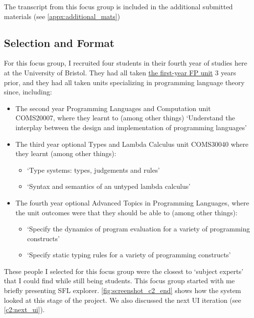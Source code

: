 The transcript from this focus group is included in the additional submitted materials (see \ref{appx:additional_mats})

\subsection{Selection and Format}

For this focus group, I recruited four students in their fourth year of studies here at the University of Bristol. They had all taken \hyperref[COMS10016]{the first-year FP unit} 3 years prior, and they had all taken units specializing in programming language theory since, including:

\begin{itemize}
    \item The second year Programming Languages and Computation unit COMS20007, where they learnt to (among other things) `Understand the interplay between the design and implementation of programming languages' \cite{COMS20007_PLC}
    \item The third year optional Types and Lambda Calculus unit COMS30040 where they learnt (among other things): \cite{COMS30040_TLC} 
    \begin{itemize}
        \item `Type systems: types, judgements and rules'
        \item `Syntax and semantics of an untyped lambda calculus'
    \end{itemize}
    \item The fourth year optional Advanced Topics in Programming Languages, where the unit outcomes were that they should be able to (among other things): \cite{COMSM0067_ATPL}
    \begin{itemize}
        \item `Specify the dynamics of program evaluation for a variety of programming constructs'
        \item `Specify static typing rules for a variety of programming constructs'
    \end{itemize}
\end{itemize}

These people I selected for this focus group were the closest to `subject experts' that I could find while still being students. 
This focus group started with me briefly presenting SFL explorer. \ref{fig:screenshot_c2_end} shows how the system looked at this stage of the project. We also discussed the next UI iteration (see \ref{c2:next_ui}). 

